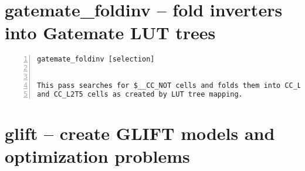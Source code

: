 \section{gatemate\_foldinv -- fold inverters into Gatemate LUT trees}
\label{cmd:gatemate_foldinv}
\begin{lstlisting}[numbers=left,frame=single]
    gatemate_foldinv [selection]


This pass searches for $__CC_NOT cells and folds them into CC_LUT2, CC_L2T4
and CC_L2T5 cells as created by LUT tree mapping.
\end{lstlisting}

\section{glift -- create GLIFT models and optimization problems}
\label{cmd:glift}
